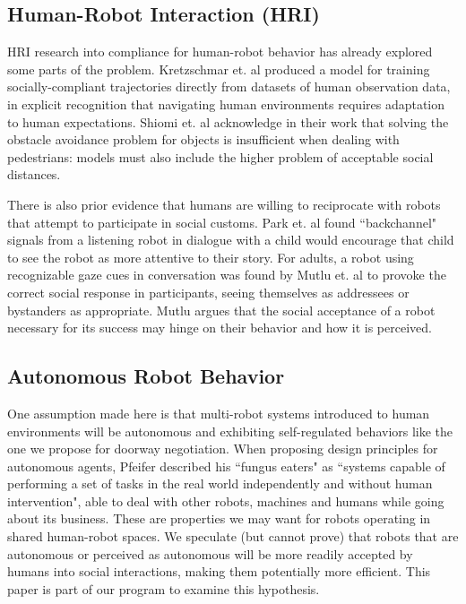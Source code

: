 \documentclass[letterpaper, 10 pt, conference]{ieeeconf}  %
\begin{document}
\subsection{Human-Robot Interaction (HRI)}

HRI research into compliance for human-robot behavior has already explored some parts of the problem. Kretzschmar et. al\cite{c6} produced a model for training socially-compliant trajectories directly from datasets of human observation data, in explicit recognition that navigating human environments requires adaptation to human expectations. Shiomi et. al\cite{c7} acknowledge in their work that solving the obstacle avoidance problem for objects is insufficient when dealing with pedestrians: models must also include the higher problem of acceptable social distances. 

There is also prior evidence that humans are willing to reciprocate with robots that attempt to participate in social customs. Park et. al\cite{c8} found ``backchannel" signals from a listening robot in dialogue with a child would encourage that child to see the robot as more attentive to their story. For adults, a robot using recognizable gaze cues in conversation was found by Mutlu et. al\cite{c9} to provoke the correct social response in participants, seeing themselves as addressees or bystanders as appropriate. Mutlu argues that the social acceptance of a robot necessary for its success may hinge on their behavior and how it is perceived.

\subsection{Autonomous Robot Behavior}

One assumption made here is that multi-robot systems introduced to human environments will be autonomous and exhibiting self-regulated behaviors like the one we propose for doorway negotiation. When proposing design principles for autonomous agents\cite{c10}, Pfeifer described his ``fungus eaters" as ``systems capable of performing a set of tasks in the real world independently and without human intervention", able to deal with other robots, machines and humans while going about its business. These are properties we may want for robots operating in shared human-robot spaces. We speculate (but cannot prove) that robots that are autonomous or perceived as autonomous will be more readily accepted by humans into social interactions, making them potentially more efficient. This paper is part of our program to examine this hypothesis. 
\end{document}
